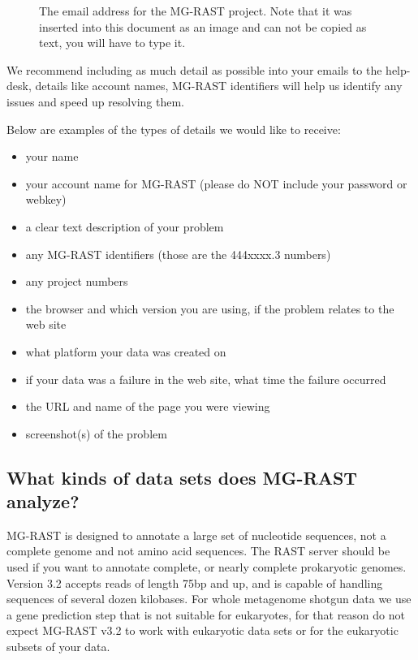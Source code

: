\documentclass[letterpaper,10pt,english]{sphinxmanual}
\begin{document}
\begin{figure}[htbp]
\centering
\capstart

\noindent{}
\caption{The email address for the MG-RAST project. Note that it was inserted
into this document as an image and can not be copied as text, you
will have to type it.}\label{\detokenize{faq:fig-mgrastemail}}\end{figure}

We recommend including as much detail as possible into your emails to
the help-desk, details like account names, MG-RAST identifiers will help
us identify any issues and speed up resolving them.

Below are examples of the types of details we would like to receive:
\begin{itemize}
\item {} 
your name

\item {} 
your account name for MG-RAST (please do NOT include your password or
webkey)

\item {} 
a clear text description of your problem

\item {} 
any MG-RAST identifiers (those are the 444xxxx.3 numbers)

\item {} 
any project numbers

\item {} 
the browser and which version you are using, if the problem relates
to the web site

\item {} 
what platform your data was created on

\item {} 
if your data was a failure in the web site, what time the failure
occurred

\item {} 
the URL and name of the page you were viewing

\item {} 
screenshot(s) of the problem

\end{itemize}


\subsection{What kinds of data sets does MG-RAST analyze?}
\label{\detokenize{faq:what-kinds-of-data-sets-does-mg-rast-analyze}}
MG-RAST is designed to annotate a large set of nucleotide sequences, not
a complete genome and not amino acid sequences. The RAST server should
be used if you want to annotate complete, or nearly complete prokaryotic
genomes. Version 3.2 accepts reads of length 75bp and up, and is capable
of handling sequences of several dozen kilobases. For whole metagenome
shotgun data we use a gene prediction step that is not suitable for
eukaryotes, for that reason do not expect MG-RAST v3.2 to work with
eukaryotic data sets or for the eukaryotic subsets of your data.
\end{document}
